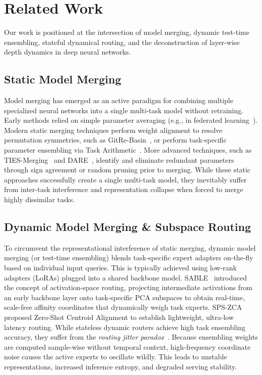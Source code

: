 \section{Related Work}
\label{submission:sec:related_work}

Our work is positioned at the intersection of model merging, dynamic test-time ensembling, stateful dynamical routing, and the deconstruction of layer-wise depth dynamics in deep neural networks.

\subsection{Static Model Merging}
Model merging has emerged as an active paradigm for combining multiple specialized neural networks into a single multi-task model without retraining. Early methods relied on simple parameter averaging (e.g., in federated learning~\cite{mitchell80, langley00}). Modern static merging techniques perform weight alignment to resolve permutation symmetries, such as GitRe-Basin~\cite{gitrebasin}, or perform task-specific parameter ensembling via Task Arithmetic~\cite{task_arithmetic}. More advanced techniques, such as TIES-Merging~\cite{ties_merging} and DARE~\cite{dare}, identify and eliminate redundant parameters through sign agreement or random pruning prior to merging. While these static approaches successfully create a single multi-task model, they inevitably suffer from inter-task interference and representation collapse when forced to merge highly dissimilar tasks.

\subsection{Dynamic Model Merging \& Subspace Routing}
To circumvent the representational interference of static merging, dynamic model merging (or test-time ensembling) blends task-specific expert adapters on-the-fly based on individual input queries. This is typically achieved using low-rank adapters (LoRAs) plugged into a shared backbone model. 
SABLE~\cite{sable_2024} introduced the concept of activation-space routing, projecting intermediate activations from an early backbone layer onto task-specific PCA subspaces to obtain real-time, scale-free affinity coordinates that dynamically weigh task experts. SPS-ZCA~\cite{pac_zca_2026} proposed Zero-Shot Centroid Alignment to establish lightweight, ultra-low latency routing. 
While stateless dynamic routers achieve high task ensembling accuracy, they suffer from the \emph{routing jitter paradox}~\cite{sable_2024}. Because ensembling weights are computed sample-wise without temporal context, high-frequency coordinate noise causes the active experts to oscillate wildly. This leads to unstable representations, increased inference entropy, and degraded serving stability.

